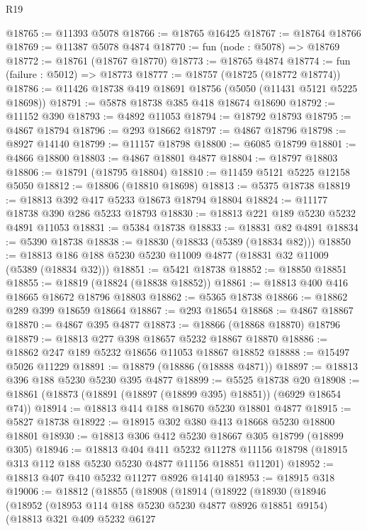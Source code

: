 \begin{lexlean}{R19}
\begin{coremodule}
@18765 := @11393 @5078
@18766 := @18765 @16425
@18767 := @18764 @18766
@18769 := @11387 @5078 @4874
@18770 := fun (node : @5078) => @18769
@18772 := @18761 (@18767 @18770)
@18773 := @18765 @4874
@18774 := fun (failure : @5012) => @18773
@18777 := @18757 (@18725 (@18772 @18774))
@18786 := @11426 @18738 @419 @18691 @18756 (@5050 (@11431 @5121 @5225 @18698))
@18791 := @5878 @18738 @385 @418 @18674 @18690
@18792 := @11152 @390
@18793 := @4892 @11053
@18794 := @18792 @18793
@18795 := @4867 @18794
@18796 := @293 @18662
@18797 := @4867 @18796
@18798 := @8927 @14140
@18799 := @11157 @18798
@18800 := @6085 @18799
@18801 := @4866 @18800
@18803 := @4867 @18801 @4877
@18804 := @18797 @18803
@18806 := @18791 (@18795 @18804)
@18810 := @11459 @5121 @5225 @12158 @5050
@18812 := @18806 (@18810 @18698)
@18813 := @5375 @18738
@18819 := @18813 @392 @417 @5233 @18673 @18794 @18804
@18824 := @11177 @18738 @390 @286 @5233 @18793
@18830 := @18813 @221 @189 @5230 @5232 @4891 @11053
@18831 := @5384 @18738
@18833 := @18831 @82 @4891
@18834 := @5390 @18738
@18838 := @18830 (@18833 (@5389 (@18834 @82)))
@18850 := @18813 @186 @188 @5230 @5230 @11009 @4877 (@18831 @32 @11009 (@5389 (@18834 @32)))
@18851 := @5421 @18738
@18852 := @18850 @18851
@18855 := @18819 (@18824 (@18838 @18852))
@18861 := @18813 @400 @416 @18665 @18672 @18796 @18803
@18862 := @5365 @18738
@18866 := @18862 @289 @399 @18659 @18664
@18867 := @293 @18654
@18868 := @4867 @18867
@18870 := @4867 @395 @4877
@18873 := @18866 (@18868 @18870) @18796
@18879 := @18813 @277 @398 @18657 @5232 @18867 @18870
@18886 := @18862 @247 @189 @5232 @18656 @11053 @18867 @18852
@18888 := @15497 @5026 @11229
@18891 := @18879 (@18886 (@18888 @4871))
@18897 := @18813 @396 @188 @5230 @5230 @395 @4877
@18899 := @5525 @18738 @20
@18908 := @18861 (@18873 (@18891 (@18897 (@18899 @395) @18851)) (@6929 @18654 @74))
@18914 := @18813 @414 @188 @18670 @5230 @18801 @4877
@18915 := @5827 @18738
@18922 := @18915 @302 @380 @413 @18668 @5230 @18800 @18801
@18930 := @18813 @306 @412 @5230 @18667 @305 @18799 (@18899 @305)
@18946 := @18813
    @404
    @411
    @5232
    @11278
    @11156
    @18798
    (@18915 @313 @112 @188 @5230 @5230 @4877 @11156 @18851 @11201)
@18952 := @18813 @407 @410 @5232 @11277 @8926 @14140
@18953 := @18915 @318
@19006 := @18812
    (@18855
      (@18908
        (@18914
          (@18922
            (@18930
              (@18946
                (@18952
                  (@18953 @114 @188 @5230 @5230 @4877 @8926 @18851 @9154)
                  (@18813
                    @321
                    @409
                    @5232
                    @6127

\end{coremodule}
\end{lexlean}

